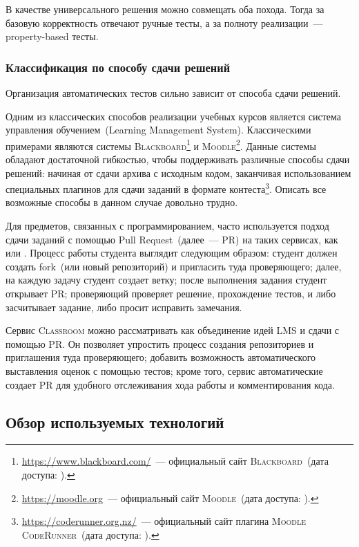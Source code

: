 В качестве универсального решения можно совмещать оба похода.
Тогда за базовую корректность отвечают ручные тесты, а за полноту реализации~--- property-based тесты.

\subsubsection{Классификация по способу сдачи решений}

Организация автоматических тестов сильно зависит от способа сдачи решений.

Одним из классических способов реализации учебных курсов является система управления обучением~(Learning Management System).
Классическими примерами являются системы \textsc{Blackboard}\footnote{\url{https://www.blackboard.com/}~--- официальный сайт \textsc{Blackboard}~(дата доступа: ).} и \textsc{Moodle}\footnote{\url{https://moodle.org}~--- официальный сайт \textsc{Moodle}~(дата доступа: ).}.
Данные системы обладают достаточной гибкостью, чтобы поддерживать различные способы сдачи решений: начиная от сдачи архива с исходным кодом, заканчивая использованием специальных плагинов для сдачи заданий в формате контеста\footnote{\url{https://coderunner.org.nz/}~--- официальный сайт плагина \textsc{Moodle CodeRunner}~(дата доступа: ).}.
Описать все возможные способы в данном случае довольно трудно.

Для предметов, связанных с программированием, часто используется подход сдачи заданий с помощью Pull Request~(далее~--- PR) на таких сервисах, как \GitHub{} или \gitlab{}.
Процесс работы студента выглядит следующим образом: студент должен создать fork~(или новый репозиторий) и пригласить туда проверяющего; далее, на каждую задачу студент создает ветку; после выполнения задания студент открывает PR; проверяющий проверяет решение, прохождение тестов, и либо засчитывает задание, либо просит исправить замечания.

Сервис \GitHub{} \textsc{Classroom} можно рассматривать как объединение идей LMS и сдачи с помощью PR.
Он позволяет упростить процесс создания репозиториев и приглашения туда проверяющего; добавить возможность автоматического выставления оценок с помощью тестов; кроме того, сервис автоматические создает PR для удобного отслеживания хода работы и комментирования кода.

\subsection{Обзор используемых технологий}

